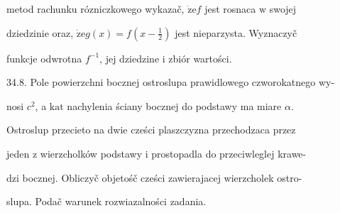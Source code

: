 \documentclass[a4paper,12pt]{article}
\begin{document}
metod rachunku rózniczkowego wykazač, $\dot{\mathrm{z}}\mathrm{e}f$ jest rosnaca $\mathrm{w}$ swojej

dziedzinie oraz, $\dot{\mathrm{z}}\mathrm{e}g(x) = f(x-\displaystyle \frac{1}{2})$ jest nieparzysta. Wyznaczyč

funkcje odwrotna $f^{-1}$, jej dziedzine $\mathrm{i}$ zbiór wartości.

34.8. Pole powierzchni bocznej ostroslupa prawidlowego czworokatnego wy-

nosi $c^{2}$, a $\mathrm{k}\mathrm{a}\mathrm{t}$ nachylenia ściany bocznej do podstawy ma miare $\alpha.$

Ostroslup przecieto na dwie cześci plaszczyzna przechodzaca przez

jeden $\mathrm{z}$ wierzcholków podstawy $\mathrm{i}$ prostopadla do przeciwleglej krawe-

dzi bocznej. Obliczyč objetośč cześci zawierajacej wierzcholek ostro-

slupa. Podač warunek rozwiazalności zadania.
\end{document}
